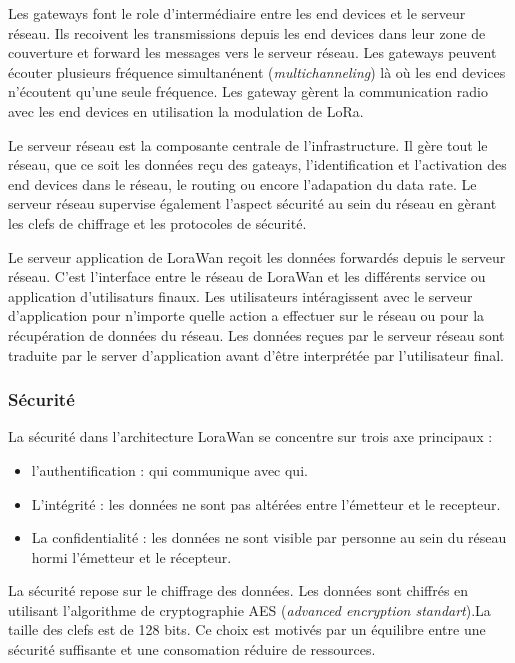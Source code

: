 Les gateways font le role d'intermédiaire entre les end devices et le serveur réseau. Ils recoivent les transmissions depuis les end devices dans leur zone de couverture
et forward les messages vers le serveur réseau. Les gateways peuvent écouter plusieurs fréquence simultanénent (\textit{multichanneling}) là où les end devices n'écoutent qu'une seule fréquence. Les gateway gèrent la communication radio avec les end devices en utilisation la modulation de LoRa.

Le serveur réseau est la composante centrale de l'infrastructure. Il gère tout le réseau, que ce soit les données reçu des gateays, l'identification et l'activation des end devices dans le réseau, le routing ou encore l'adapation du data rate. Le serveur réseau supervise également l'aspect sécurité au sein du réseau en gèrant les clefs de chiffrage et les protocoles de sécurité.

Le serveur application de LoraWan reçoit les données forwardés depuis le serveur réseau. C'est l'interface entre le réseau de LoraWan et les différents service ou application d'utilisaturs finaux. Les utilisateurs intéragissent avec le serveur d'application pour n'importe quelle action a effectuer sur le réseau ou pour la récupération de données du réseau. Les données reçues par le serveur réseau sont traduite par le server d'application avant d'être interprétée par l'utilisateur final.

\subsubsection{Sécurité}

La sécurité dans l'architecture LoraWan se concentre sur trois axe principaux :

\begin{itemize}
\item l'authentification : qui communique avec qui.
\item L'intégrité : les données ne sont pas altérées entre l'émetteur et le recepteur.
\item La confidentialité : les données ne sont visible par personne au sein du réseau hormi l'émetteur et le récepteur. 
\end{itemize}

La sécurité repose sur le chiffrage des données. Les données sont chiffrés en utilisant l'algorithme de cryptographie AES (\textit{advanced encryption standart}).La taille des clefs est de 128 bits. Ce choix est motivés par un équilibre entre une sécurité suffisante et une consomation réduire de ressources.

